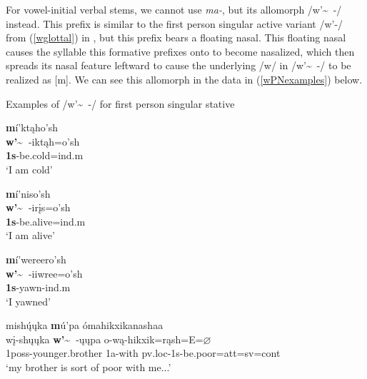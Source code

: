 
For vowel-initial verbal stems, we cannot use \textit{ma-}, but its allomorph /w'\~~-/ instead. This prefix is similar to the first person singular active variant /w'-/ from (\ref{wglottal}) in , but this prefix bears a floating nasal. This floating nasal causes the syllable this formative prefixes onto to become nasalized, which then spreads its nasal feature leftward to cause the underlying /w/ in /w'\~~-/ to be realized as [m]. We can see this allomorph in the data in (\ref{wPNexamples}) below.

\begin{exe}

\item\label{wPNexamples} Examples of /w'\~~-/ for first person singular stative

	\begin{xlist}
	
	\item \glll \textbf{m}í'ktąho'sh\\
	\textbf{w'\~~}-iktąh=o'sh\\
	\textbf{1s}-\textnormal{be.cold}=ind.m\\
	\glt `I am cold' \citep[88]{hollow1970}
	
	\item \glll \textbf{m}í'niso'sh\\
	\textbf{w'\~~}-irįs=o'sh\\
	\textbf{1s}-\textnormal{be.alive}=ind.m\\
	\glt `I am alive' \citep[91]{hollow1970}
	
	\item \glll \textbf{m}í'wereero'sh\\
	\textbf{w'\~~}-iiwree=o'sh\\
	\textbf{1s}-\textnormal{yawn}-ind.m\\
	\glt `I yawned' \citep[98]{hollow1970}
	
	\item \glll mishų́ųka \textbf{m}ú'pa ómahikxikanashaa\\
	wį-shųųka \textbf{w'\~~}-ųųpa o-wą-hikxik=rąsh=E=$\varnothing$\\
	1poss-\textnormal{younger.brother} 1a-\textnormal{with} pv.loc-{1s}-\textnormal{be.poor}=att=sv=cont\\
	\glt `my brother is sort of poor with me...' \cite[284]{hollow1973b}
	
	\end{xlist}

\end{exe}

